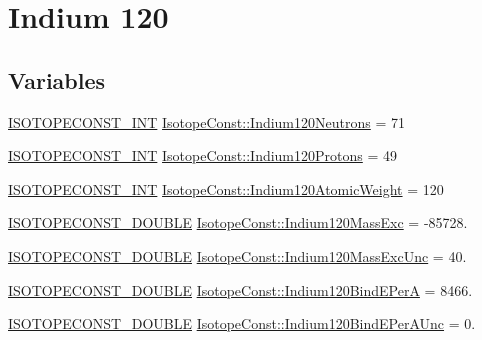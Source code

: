 \hypertarget{group___isotope_const-_indium-_in120}{}\section{Indium 120}
\label{group___isotope_const-_indium-_in120}
\subsection*{Variables}
\begin{DoxyCompactItemize}
\item 
\mbox{\hyperlink{group___isotope_const-_macros_ga5f18360b3e99483a35c32d789e62621c}{I\+S\+O\+T\+O\+P\+E\+C\+O\+N\+S\+T\+\_\+\+I\+NT}} \mbox{\hyperlink{group___isotope_const-_indium-_in120_ga0f6f916468e3eb40eadeca0983e40cb9}{Isotope\+Const\+::\+Indium120\+Neutrons}} = 71
\item 
\mbox{\hyperlink{group___isotope_const-_macros_ga5f18360b3e99483a35c32d789e62621c}{I\+S\+O\+T\+O\+P\+E\+C\+O\+N\+S\+T\+\_\+\+I\+NT}} \mbox{\hyperlink{group___isotope_const-_indium-_in120_ga4e3c89a50ad20b4bcaab4435593caa92}{Isotope\+Const\+::\+Indium120\+Protons}} = 49
\item 
\mbox{\hyperlink{group___isotope_const-_macros_ga5f18360b3e99483a35c32d789e62621c}{I\+S\+O\+T\+O\+P\+E\+C\+O\+N\+S\+T\+\_\+\+I\+NT}} \mbox{\hyperlink{group___isotope_const-_indium-_in120_gaf2b3bfd22c128149f1e2092a1b6baa05}{Isotope\+Const\+::\+Indium120\+Atomic\+Weight}} = 120
\item 
\mbox{\hyperlink{group___isotope_const-_macros_ga8f45a7272ce02c0b4c65c44636ed719a}{I\+S\+O\+T\+O\+P\+E\+C\+O\+N\+S\+T\+\_\+\+D\+O\+U\+B\+LE}} \mbox{\hyperlink{group___isotope_const-_indium-_in120_ga4396fea63103db9f6a547a63bfd794fc}{Isotope\+Const\+::\+Indium120\+Mass\+Exc}} = -\/85728.
\item 
\mbox{\hyperlink{group___isotope_const-_macros_ga8f45a7272ce02c0b4c65c44636ed719a}{I\+S\+O\+T\+O\+P\+E\+C\+O\+N\+S\+T\+\_\+\+D\+O\+U\+B\+LE}} \mbox{\hyperlink{group___isotope_const-_indium-_in120_gae5b7037c8f6a3139bfbd40018dbabdf0}{Isotope\+Const\+::\+Indium120\+Mass\+Exc\+Unc}} = 40.
\item 
\mbox{\hyperlink{group___isotope_const-_macros_ga8f45a7272ce02c0b4c65c44636ed719a}{I\+S\+O\+T\+O\+P\+E\+C\+O\+N\+S\+T\+\_\+\+D\+O\+U\+B\+LE}} \mbox{\hyperlink{group___isotope_const-_indium-_in120_gac27279ca3b378796f34f16db1df72b7c}{Isotope\+Const\+::\+Indium120\+Bind\+E\+PerA}} = 8466.
\item 
\mbox{\hyperlink{group___isotope_const-_macros_ga8f45a7272ce02c0b4c65c44636ed719a}{I\+S\+O\+T\+O\+P\+E\+C\+O\+N\+S\+T\+\_\+\+D\+O\+U\+B\+LE}} \mbox{\hyperlink{group___isotope_const-_indium-_in120_ga0cd284763babac43a26c5c9570955e54}{Isotope\+Const\+::\+Indium120\+Bind\+E\+Per\+A\+Unc}} = 0.

\end{DoxyCompactItemize}
